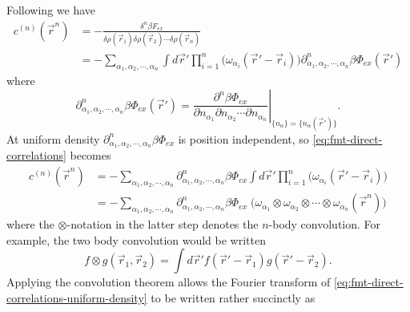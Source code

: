 \documentclass[12pt]{report}
\begin{document}
Following \cite{Rosenfeld1990} we have
\begin{equation}\label{eq:fmt-direct-correlations}
  \begin{aligned}
    c^{(n)}(\vec{r}^n) &=
    - \frac{\delta^n \beta F_{ex}}{\delta \rho(\vec{r}_1)\delta \rho(\vec{r}_2) \cdots \delta \rho(\vec{r}_n)} \\
    &=
    - \sum_{\alpha_1, \alpha_2, \cdots, \alpha_n}
    \int d\vec{r}'
    \prod_{i=1}^n \Big( \omega_{\alpha_i}(\vec{r}' - \vec{r}_i) \Big)
    \partial^n_{\alpha_1, \alpha_2, \cdots, \alpha_n} \beta\Phi_{ex}(\vec{r}')
  \end{aligned}
\end{equation}
where
\begin{equation*}
  \partial^n_{\alpha_1, \alpha_2, \cdots, \alpha_n} \beta\Phi_{ex}(\vec{r}') =
  \left.
  \frac{\partial^n \beta\Phi_{ex}}{\partial n_{\alpha_1} \partial n_{\alpha_2} \cdots \partial n_{\alpha_n}}
  \right|_{\{n_\alpha\} = \{n_\alpha(\vec{r}')\}}.
\end{equation*}
At uniform density $\partial^n_{\alpha_1, \alpha_2, \cdots, \alpha_n} \beta\Phi_{ex}$ is position independent, so \eqref{eq:fmt-direct-correlations} becomes
\begin{equation}\label{eq:fmt-direct-correlations-uniform-density}
  \begin{aligned}
    c^{(n)}(\vec{r}^n) &=
    - \sum_{\alpha_1, \alpha_2, \cdots, \alpha_n}
    \partial^n_{\alpha_1, \alpha_2, \cdots, \alpha_n} \beta\Phi_{ex}
    \int d\vec{r}'
    \prod_{i=1}^n \Big( \omega_{\alpha_i}(\vec{r}' - \vec{r}_i) \Big) \\
    &=
    - \sum_{\alpha_1, \alpha_2, \cdots, \alpha_n}
    \partial^n_{\alpha_1, \alpha_2, \cdots, \alpha_n} \beta\Phi_{ex} \;
    \Big(
    \omega_{\alpha_1} \otimes \omega_{\alpha_2} \otimes \cdots \otimes \omega_{\alpha_n}
    (\vec{r}^n)
    \Big)
  \end{aligned}
\end{equation}
where the $\otimes$-notation in the latter step denotes the $n$-body convolution.
For example, the two body convolution would be written%
\begin{equation*}
  f \otimes g(\vec{r}_1, \vec{r}_2) =
  \int d\vec{r}' f(\vec{r}' - \vec{r}_1) g(\vec{r}' - \vec{r}_2).
\end{equation*}
Applying the convolution theorem allows the Fourier transform of \eqref{eq:fmt-direct-correlations-uniform-density} to be written rather succinctly as
\end{document}
